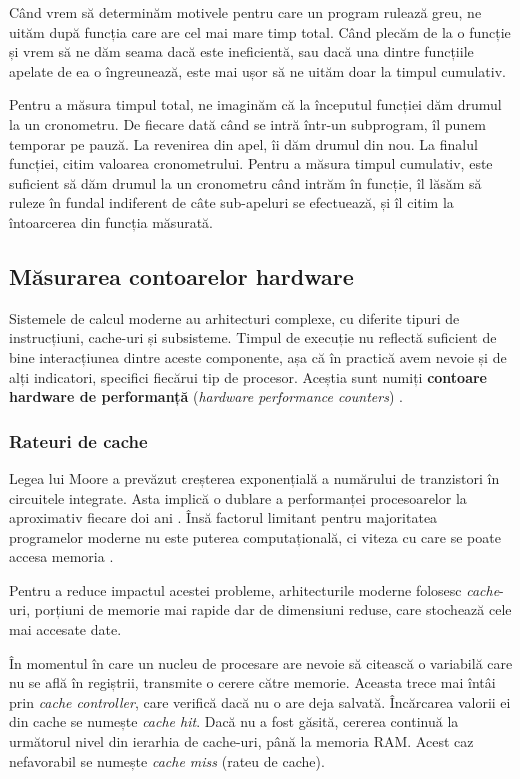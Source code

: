 Când vrem să determinăm motivele pentru care un program rulează greu, ne uităm după funcția care are cel mai mare timp total. Când plecăm de la o funcție și vrem să ne dăm seama dacă este ineficientă, sau dacă una dintre funcțiile apelate de ea o îngreunează, este mai ușor să ne uităm doar la timpul cumulativ.

Pentru a măsura timpul total, ne imaginăm că la începutul funcției dăm drumul la un cronometru. De fiecare dată când se intră într-un subprogram, îl punem temporar pe pauză. La revenirea din apel, îi dăm drumul din nou. La finalul funcției, citim valoarea cronometrului. Pentru a măsura timpul cumulativ, este suficient să dăm drumul la un cronometru când intrăm în funcție, îl lăsăm să ruleze în fundal indiferent de câte sub-apeluri se efectuează, și îl citim la întoarcerea din funcția măsurată.

\subsection{Măsurarea contoarelor hardware}

Sistemele de calcul moderne au arhitecturi complexe, cu diferite tipuri de instrucțiuni, cache-uri și subsisteme. Timpul de execuție nu reflectă suficient de bine interacțiunea dintre aceste componente, așa că în practică avem nevoie și de alți indicatori, specifici fiecărui tip de procesor. Aceștia sunt numiți \textbf{contoare hardware de performanță} (\textit{hardware performance counters}) \cite{hardware_performance_monitoring}.

\subsubsection*{Rateuri de cache}

Legea lui Moore a prevăzut creșterea exponențială a numărului de tranzistori în circuitele integrate. Asta implică o dublare a performanței procesoarelor la aproximativ fiecare doi ani \cite{moores_law}. Însă factorul limitant pentru majoritatea programelor moderne nu este puterea computațională, ci viteza cu care se poate accesa memoria \cite{what_every_programmer_should_know_about_memory}.

Pentru a reduce impactul acestei probleme, arhitecturile moderne folosesc \emph{cache}-uri, porțiuni de memorie mai rapide dar de dimensiuni reduse, care stochează cele mai accesate date.

În momentul în care un nucleu de procesare are nevoie să citească o variabilă care nu se află în regiștrii, transmite o cerere către memorie. Aceasta trece mai întâi prin \emph{cache controller}, care verifică dacă nu o are deja salvată. Încărcarea valorii ei din cache se numește \emph{cache hit}. Dacă nu a fost găsită, cererea continuă la următorul nivel din ierarhia de cache-uri, până la memoria RAM. Acest caz nefavorabil se numește \emph{cache miss} (rateu de cache).

